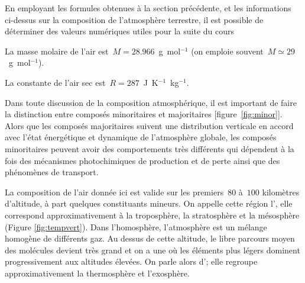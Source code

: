 \sk
\begin{finger}
\item En employant les formules obtenues à la section précédente, et les informations ci-dessus sur la composition de l'atmosphère terrestre, il est possible de déterminer des valeurs numériques utiles pour la suite du cours
\begin{citemize}
\item La masse molaire de l'air est~$M = 28.966$~g~mol$^{-1}$ (on emploie souvent~$M \simeq 29$~g~mol$^{-1}$). 
\item La constante de l'air sec est~$R = 287$~J~K$^{-1}$~kg$^{-1}$.
\end{citemize}  
\item Dans toute discussion de la composition atmosphérique, il est important de faire la distinction entre composés minoritaires et majoritaires [figure~\ref{fig:minor}]. Alors que les composés majoritaires suivent une distribution verticale en accord avec l'état énergétique et dynamique de l'atmosphère globale, les composés minoritaires peuvent avoir des comportements très différents qui dépendent à la fois des mécanismes photochimiques de production et de perte ainsi que des phénomènes de transport.
\item La composition de l'air donnée ici est valide sur les premiers~$80$ à~$100$ kilomètres d'altitude, à part quelques constituants mineurs. On appelle cette région l', elle correspond approximativement à la troposphère, la stratosphère et la mésosphère (Figure \ref{fig:tempvert}). Dans l'homosphère, l'atmosphère est un mélange homogène de différents gaz. Au dessus de cette altitude, le libre parcours moyen des molécules devient très grand et on a une  où les éléments plus légers dominent progressivement aux altitudes élevées. On parle alors d'; elle regroupe approximativement la thermosphère et l'exosphère. 
\end{finger}


